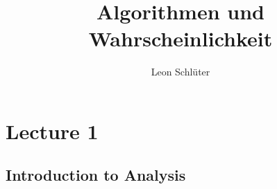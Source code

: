 \documentclass[a4paper,10pt]{article}
\title{Algorithmen und Wahrscheinlichkeit}
\author{Leon Schlüter}
\begin{document}
\maketitle
    \section{Lecture 1}
    \subsection{Introduction to Analysis}
\end{document}

